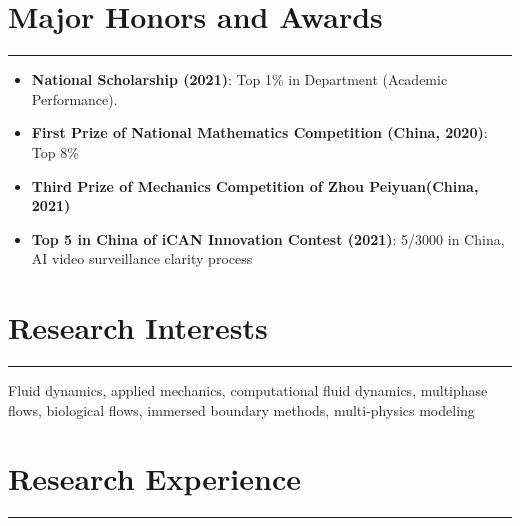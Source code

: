 \documentclass[11pt]{article}
\begin{document}
\vspace{6mm}

\section*{Major Honors and Awards}
\hrule

\begin{itemize}[leftmargin=*,itemsep=1pt]
    \item \textbf{National Scholarship (2021)}: Top 1\% in Department (Academic Performance). 
    \item \textbf{First Prize of National Mathematics Competition (China, 2020)}: Top 8\% 
    \item \textbf{Third Prize of Mechanics Competition of Zhou Peiyuan(China, 2021)} 
    \item \textbf{Top 5 in China of iCAN Innovation Contest (2021)}: 5/3000 in China, AI video surveillance clarity process
\end{itemize}

\vspace{6mm}

\section*{Research Interests}
\hrule

\noindent Fluid dynamics, applied mechanics, computational fluid dynamics, multiphase flows, biological flows, immersed boundary methods, multi-physics modeling

\vspace{6mm}

\section*{Research Experience}
\hrule
\end{document}
